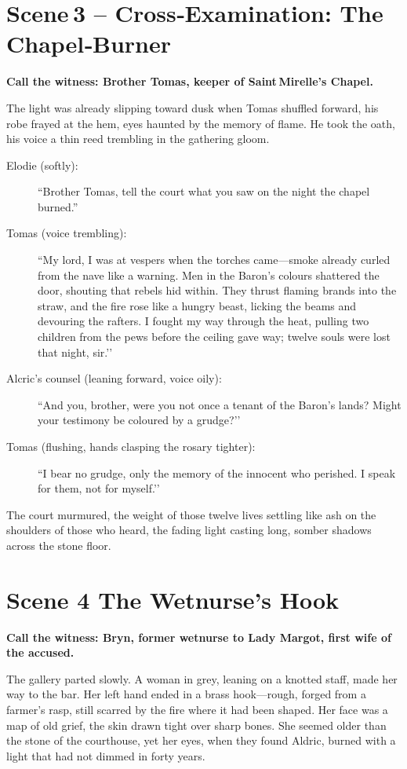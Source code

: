 \documentclass[11pt]{book}
\begin{document}
\section*{Scene 3 – Cross‑Examination: The Chapel‑Burner}
\smallskip
\textbf{Call the witness: Brother Tomas, keeper of Saint Mirelle’s Chapel.}

The light was already slipping toward dusk when Tomas shuffled forward, his robe frayed at the hem, eyes haunted by the memory of flame. He took the oath, his voice a thin reed trembling in the gathering gloom.

\begin{description}
\item[Elodie (softly):] ``Brother Tomas, tell the court what you saw on the night the chapel burned.''
\item[Tomas (voice trembling):] ``My lord, I was at vespers when the torches came—smoke already curled from the nave like a warning. Men in the Baron’s colours shattered the door, shouting that rebels hid within. They thrust flaming brands into the straw, and the fire rose like a hungry beast, licking the beams and devouring the rafters. I fought my way through the heat, pulling two children from the pews before the ceiling gave way; twelve souls were lost that night, sir.’’
\item[Alcric’s counsel (leaning forward, voice oily):] ``And you, brother, were you not once a tenant of the Baron’s lands? Might your testimony be coloured by a grudge?’’
\item[Tomas (flushing, hands clasping the rosary tighter):] ``I bear no grudge, only the memory of the innocent who perished. I speak for them, not for myself.’’
\end{description}

The court murmured, the weight of those twelve lives settling like ash on the shoulders of those who heard, the fading light casting long, somber shadows across the stone floor.

\section*{Scene 4 The Wetnurse’s Hook}
\smallskip
\textbf{Call the witness: Bryn, former wetnurse to Lady Margot, first wife of the accused.}

The gallery parted slowly. A woman in grey, leaning on a knotted staff, made her way to the bar. Her left hand ended in a brass hook—rough, forged from a farmer’s rasp, still scarred by the fire where it had been shaped. Her face was a map of old grief, the skin drawn tight over sharp bones. She seemed older than the stone of the courthouse, yet her eyes, when they found Aldric, burned with a light that had not dimmed in forty years.
\end{document}
